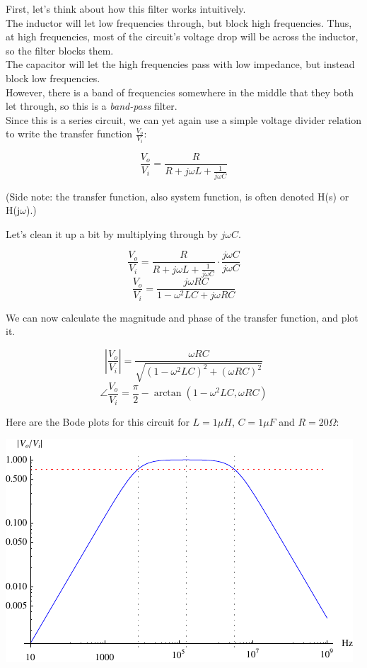 \documentclass[12pt,a4paper]{report}
\begin{document}
First, let's think about how this filter works intuitively.\\
The inductor will let low frequencies through, but block high frequencies. Thus, at high frequencies, most of the circuit's voltage drop will be across the inductor, so the filter blocks them.\\
The capacitor will let the high frequencies pass with low impedance, but instead block low frequencies.\\
However, there is a band of frequencies somewhere in the middle that they both let through, so this is a \emph{band-pass} filter.\\

Since this is a series circuit, we can yet again use a simple voltage divider relation to write the transfer function $\displaystyle \frac{V_o}{V_i}$:

\[ \frac{V_o}{V_i} = \frac{R}{R + j\omega L + \frac{1}{j\omega C}} \]

(Side note: the transfer function, also system function, is often denoted H(s) or H(j$\omega$).)

Let's clean it up a bit by multiplying through by $j\omega C$.

\[ \frac{V_o}{V_i} = \frac{R}{R + j\omega L + \frac{1}{j\omega C}} \cdot \frac{j\omega C}{j\omega C} \]
\[ \frac{V_o}{V_i} = \frac{j\omega RC}{1 - \omega^2 LC + j\omega RC} \]

We can now calculate the magnitude and phase of the transfer function, and plot it.

\[ \left| \frac{V_o}{V_i} \right| = \frac{\omega RC}{\sqrt{(1 - \omega^2 LC)^2 + (\omega RC)^2}} \]
\[ \angle \frac{V_o}{V_i} = \frac{\pi}{2} - \arctan{(1 - \omega^2 LC, \omega RC)} \]

Here are the Bode plots for this circuit for $L = 1 \mu H$, $C = 1 \mu F$ and $R = 20 \Omega$:

\includegraphics[scale=1.75]{Graphics/bpf_magnitude_plot}
\end{document}
